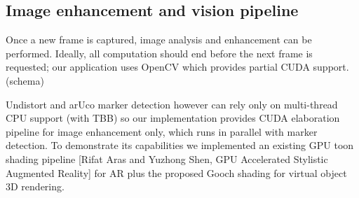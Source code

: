 \subsection{Image enhancement and vision pipeline}
Once a new frame is captured, image analysis and enhancement can be performed. Ideally, all computation should end before the next frame is requested; our application uses OpenCV which provides partial CUDA support.\\

(schema)

Undistort and arUco marker detection however can rely only on multi-thread CPU support (with TBB) so our implementation provides CUDA elaboration pipeline for image enhancement only, which runs in parallel with marker detection. To demonstrate its capabilities we implemented an existing GPU toon shading pipeline [Rifat Aras and Yuzhong Shen, GPU Accelerated Stylistic Augmented Reality] for AR plus the proposed Gooch shading for virtual object 3D rendering.

